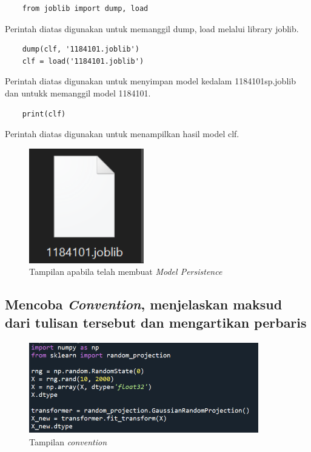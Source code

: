 \documentclass{article}
\begin{document}
\begin{verbatim}
    from joblib import dump, load    
\end{verbatim}
Perintah diatas digunakan untuk memanggil dump, load melalui library joblib.

\begin{verbatim}
    dump(clf, '1184101.joblib')
    clf = load('1184101.joblib')
\end{verbatim}
Perintah diatas digunakan untuk menyimpan model kedalam 1184101sp.joblib dan untukk memanggil model 1184101.

\begin{verbatim}
    print(clf)    
\end{verbatim}
Perintah diatas digunakan untuk menampilkan hasil model clf.

    \begin{figure}[!htbp]
            \centering
            \includegraphics[width=5cm,height=5cm]{figures/1184101/chapter1/20.PNG}
            \caption{Tampilan apabila telah membuat \textit{Model Persistence}}
            \label{penanda}
            \end{figure}

\subsection{Mencoba \textit{Convention}, menjelaskan maksud dari tulisan tersebut dan mengartikan perbaris}

    \begin{figure}[!htbp]
            \centering
            \includegraphics[width=10cm,height=4cm]{figures/1184101/chapter1/21.PNG}
            \caption{Tampilan \textit{convention}}
            \label{penanda}
            \end{figure}
\end{document}
